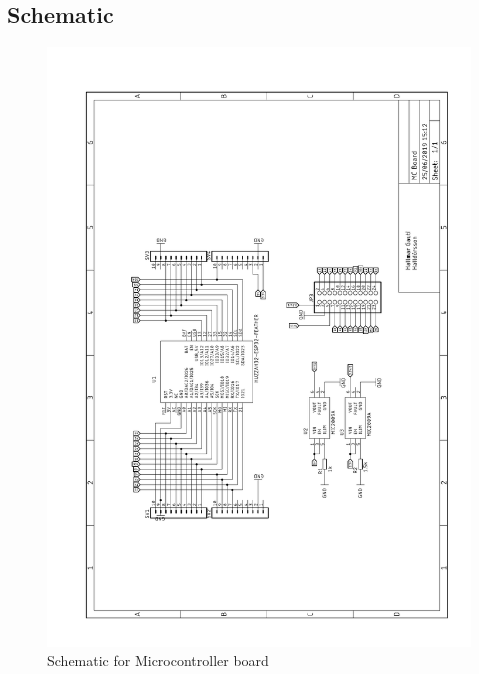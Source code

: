\documentclass{article}
\begin{document}
  \subsection{Schematic}
   \begin{figure}[H]
  	\centering
  	\includegraphics[width=1\linewidth]{microcontroller.pdf}
  	\caption{Schematic for Microcontroller board}
 	 \label{fig:schematic3}
\end{figure}
\newpage

     
\end{document}
